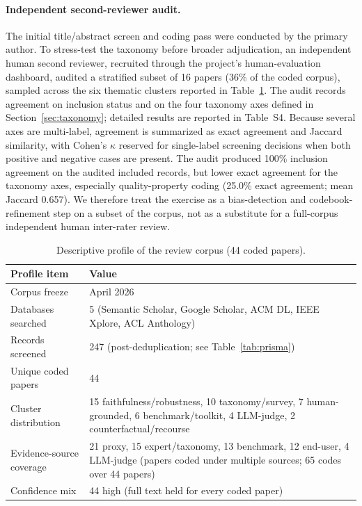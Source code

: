 \documentclass[10pt,a4paper,twoside]{article}
\begin{document}
\paragraph{Independent second-reviewer audit.}
The initial title/abstract screen and coding pass were conducted by the
primary author. To stress-test the taxonomy before broader adjudication, an
independent human second reviewer, recruited through the project's
human-evaluation dashboard, audited a stratified subset of 16 papers
(36\% of the coded corpus), sampled across the six thematic clusters
reported in Table~\ref{tab:corpus_profile}. The audit records
agreement on inclusion status and on the four taxonomy axes defined in
Section~\ref{sec:taxonomy}; detailed results are reported in
Table~S4. Because several axes are multi-label, agreement
is summarized as exact agreement and Jaccard similarity, with Cohen's
$\kappa$ reserved for single-label screening decisions when both positive
and negative cases are present. The audit produced 100\% inclusion
agreement on the audited included records, but lower exact agreement for
the taxonomy axes, especially quality-property coding (25.0\% exact
agreement; mean Jaccard 0.657). We therefore treat the exercise as a
bias-detection and codebook-refinement step on a subset of the corpus, not
as a substitute for a full-corpus independent human inter-rater review.

\begin{table}[t]
\centering
\caption{Descriptive profile of the review corpus (44 coded papers).}
\begin{tabularx}{\linewidth}{l X}
\toprule
\textbf{Profile item} & \textbf{Value} \\
\midrule
Corpus freeze & April 2026 \\
Databases searched & 5 (Semantic Scholar, Google Scholar, ACM DL, IEEE Xplore, ACL Anthology) \\
Records screened & 247 (post-deduplication; see Table~\ref{tab:prisma}) \\
Unique coded papers & 44 \\
Cluster distribution & 15 faithfulness/robustness, 10 taxonomy/survey, 7 human-grounded, 6 benchmark/toolkit, 4 LLM-judge, 2 counterfactual/recourse \\
Evidence-source coverage & 21 proxy, 15 expert/taxonomy, 13 benchmark, 12 end-user, 4 LLM-judge (papers coded under multiple sources; 65 codes over 44 papers) \\
Confidence mix & 44 high (full text held for every coded paper) \\
\bottomrule
\end{tabularx}
\label{tab:corpus_profile}
\end{table}
\end{document}
